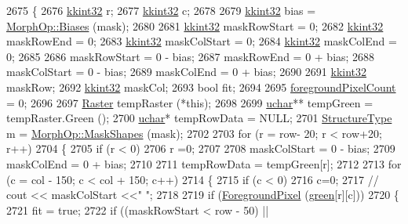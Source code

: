 \begin{DoxyCode}
2675 \{
2676   \hyperlink{namespace_k_k_b_a8fa4952cc84fda1de4bec1fbdd8d5b1b}{kkint32}  r;
2677   \hyperlink{namespace_k_k_b_a8fa4952cc84fda1de4bec1fbdd8d5b1b}{kkint32}  c;
2678 
2679   \hyperlink{namespace_k_k_b_a8fa4952cc84fda1de4bec1fbdd8d5b1b}{kkint32}  bias = \hyperlink{class_k_k_b_1_1_morph_op_affa9101a819e7103df69c8851cd7e920}{MorphOp::Biases} (mask);
2680 
2681   \hyperlink{namespace_k_k_b_a8fa4952cc84fda1de4bec1fbdd8d5b1b}{kkint32}  maskRowStart = 0;
2682   \hyperlink{namespace_k_k_b_a8fa4952cc84fda1de4bec1fbdd8d5b1b}{kkint32}  maskRowEnd   = 0; 
2683   \hyperlink{namespace_k_k_b_a8fa4952cc84fda1de4bec1fbdd8d5b1b}{kkint32}  maskColStart = 0;
2684   \hyperlink{namespace_k_k_b_a8fa4952cc84fda1de4bec1fbdd8d5b1b}{kkint32}  maskColEnd   = 0;
2685 
2686   maskRowStart = 0 - bias;
2687   maskRowEnd   = 0 + bias;
2688   maskColStart = 0 - bias;
2689   maskColEnd   = 0 + bias;
2690   
2691   \hyperlink{namespace_k_k_b_a8fa4952cc84fda1de4bec1fbdd8d5b1b}{kkint32}  maskRow;
2692   \hyperlink{namespace_k_k_b_a8fa4952cc84fda1de4bec1fbdd8d5b1b}{kkint32}  maskCol;
2693   \textcolor{keywordtype}{bool}  fit;
2694 
2695   \hyperlink{class_k_k_b_1_1_raster_aa7e86253f4b9c347da718732e44b60e8}{foregroundPixelCount} = 0;
2696 
2697   \hyperlink{class_k_k_b_1_1_raster}{Raster}  tempRaster (*\textcolor{keyword}{this});
2698 
2699   \hyperlink{namespace_k_k_b_ace9969169bf514f9ee6185186949cdf7}{uchar}**     tempGreen   = tempRaster.Green ();
2700   \hyperlink{namespace_k_k_b_ace9969169bf514f9ee6185186949cdf7}{uchar}*      tempRowData = NULL;
2701   \hyperlink{class_k_k_b_1_1_morph_op_a09e4aff7e81327849855ff72082d85b3}{StructureType}  m = \hyperlink{class_k_k_b_1_1_morph_op_a7e477ebbb2c0cdd67388cb841685c02b}{MorphOp::MaskShapes} (mask);
2702 
2703   \textcolor{keywordflow}{for}  (r = row- 20;  r < row+20;  r++)
2704   \{ 
2705     \textcolor{keywordflow}{if}  (r < 0)
2706       r =0;
2707   
2708     maskColStart = 0 - bias;
2709     maskColEnd   = 0 + bias;
2710     
2711     tempRowData = tempGreen[r];
2712 
2713     \textcolor{keywordflow}{for}  (c = col - 150; c < col + 150; c++)
2714     \{
2715       \textcolor{keywordflow}{if}  (c < 0)
2716         c=0;
2717       \textcolor{comment}{// cout << maskColStart <<" ";}
2718         
2719       \textcolor{keywordflow}{if}  (\hyperlink{class_k_k_b_1_1_raster_aa1e1363589e719eb64f0957281b84b6a}{ForegroundPixel} (\hyperlink{class_k_k_b_1_1_raster_a2d2238911145488e226cd2e34fc8448c}{green}[r][c]))
2720       \{
2721         fit = \textcolor{keyword}{true};
2722         \textcolor{keywordflow}{if}  ((maskRowStart <  row - 50)  || 

\end{DoxyCode}
